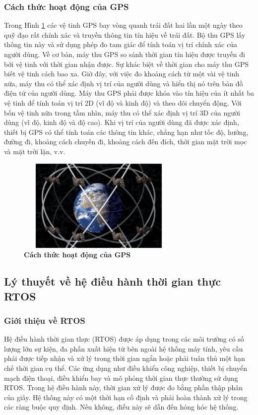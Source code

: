 \documentclass{article} %
\begin{document}
	
	\subsubsection{Cách thức hoạt động của GPS}
	
	
	Trong Hình \ref{GPS} các vệ tinh GPS bay vòng quanh trái đất hai lần một ngày theo quỹ đạo rất chính xác và truyền thông tin tín hiệu về trái đất. Bộ thu GPS lấy thông tin này và sử dụng phép đo tam giác để tính toán vị trí chính xác của người dùng. Về cơ bản, máy thu GPS so sánh thời gian tín hiệu được truyền đi bởi vệ tinh với thời gian nhận được. Sự khác biệt về thời gian cho máy thu GPS biết vệ tinh cách bao xa. Giờ đây, với việc đo khoảng cách từ một vài vệ tinh nữa, máy thu có thể xác định vị trí của người dùng và hiển thị nó trên bản đồ điện tử của người dùng. Máy thu GPS phải được khóa vào tín hiệu của ít nhất ba vệ tinh để tính toán vị trí 2D (vĩ độ và kinh độ) và theo dõi chuyển động. Với bốn vệ tinh nữa trong tầm nhìn, máy thu có thể xác định vị trí 3D của người dùng (vĩ độ, kinh độ và độ cao). Khi vị trí của người dùng đã được xác định, thiết bị GPS có thể tính toán các thông tin khác, chẳng hạn như tốc độ, hướng, đường đi, khoảng cách chuyến đi, khoảng cách đến đích, thời gian mặt trời mọc và mặt trời lặn, v.v.
	
	\begin{figure}[!ht]
		\centering
		\includegraphics[width=8cm,height=4.5cm]{Images/GPS.png}
		\caption[Cách thức hoạt động của GPS \cite{GPS} ]{\bfseries \fontsize{12pt}{0pt}\selectfont Cách thức hoạt động của GPS\cite{GPS}}
		\label{GPS}
	\end{figure}	
	
	\subsection{Lý thuyết về hệ điều hành thời gian thực RTOS }
	\subsubsection{Giới thiệu về RTOS}
	Hệ điều hành thời gian thực (RTOS) được áp dụng trong các môi trường có số lượng lớn sự kiện, đa phần xuất hiện từ bên ngoài hệ thống máy tính, yêu cầu phải được tiếp nhận và xử lý trong thời gian ngắn hoặc phải tuân thủ một hạn chế thời gian cụ thể. Các ứng dụng như điều khiển công nghiệp, thiết bị chuyển mạch điện thoại, điều khiển bay và mô phỏng thời gian thực thường sử dụng RTOS. Trong hệ điều hành này, thời gian xử lý được đo bằng phần thập phân của giây. Hệ thống này có một thời hạn cố định và phải hoàn thành xử lý trong các ràng buộc quy định. Nếu không, điều này sẽ dẫn đến hỏng hóc hệ thống.
	
\end{document}
